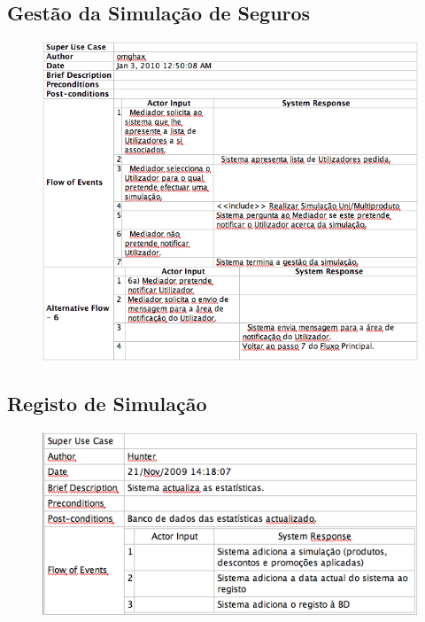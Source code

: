 \subsection{Gestão da Simulação de Seguros}
\begin{figure}[!htb]
	\centering
	\includegraphics[scale=0.60]{images/Prints/Simulador/GerirSimulacaoSeguros.png}
\end{figure}

\subsection{Registo de Simulação}
\begin{figure}[!htb]
	\centering
	\includegraphics[scale=0.60]{images/Prints/Simulador/RegistarSimulacao.png}
\end{figure}

\pagebreak

